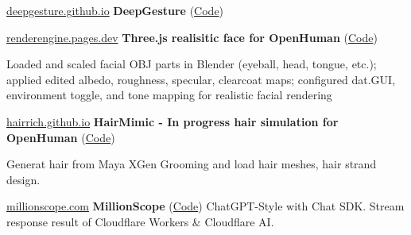 


\begin{twocolentry}{\href{https://deepgesture.github.io}{deepgesture.github.io}}
	\textbf{DeepGesture} (\href{https://github.com/DeepGesture/DeepGesture}{Code})
\end{twocolentry}


\begin{twocolentry}{\href{https://renderengine.pages.dev}{renderengine.pages.dev}}
	\textbf{Three.js realisitic face for OpenHuman} (\href{https://github.com/openhuman-ai/renderengine}{Code})
	\begin{highlights}
		\item Loaded and scaled facial OBJ parts in Blender (eyeball, head, tongue, etc.); applied edited albedo, roughness, specular, clearcoat maps; configured dat.GUI, environment toggle, and tone mapping for realistic facial rendering
	\end{highlights}
\end{twocolentry}

\begin{twocolentry}{\href{https://hairrich.github.io}{hairrich.github.io}}
	\textbf{HairMimic - In progress hair simulation for OpenHuman} (\href{https://github.com/hairmimic/hairmimic.github.io}{Code})
	\begin{highlights}
			\item Generat hair from Maya XGen Grooming and load hair meshes, hair strand design.
	\end{highlights}
\end{twocolentry}




\cvspace

\begin{twocolentry}{\href{https://millionscope.com}{millionscope.com}}
	\textbf{MillionScope}  (\href{https://github.com/millionscope/millionscope.github.io}{Code}) ChatGPT-Style with Chat SDK. Stream response result of Cloudflare Workers \& Cloudflare AI.
\end{twocolentry}

